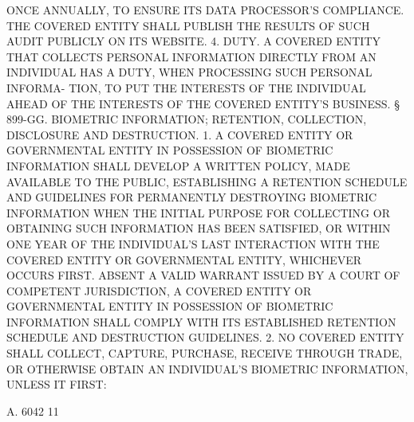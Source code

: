 ONCE  ANNUALLY,  TO ENSURE ITS DATA PROCESSOR'S COMPLIANCE.  THE COVERED
 ENTITY SHALL PUBLISH THE RESULTS OF SUCH AUDIT PUBLICLY ON ITS WEBSITE.
   4. DUTY. A COVERED ENTITY THAT COLLECTS PERSONAL INFORMATION  DIRECTLY
 FROM  AN  INDIVIDUAL  HAS A DUTY, WHEN PROCESSING SUCH PERSONAL INFORMA-
 TION, TO PUT THE INTERESTS OF THE INDIVIDUAL AHEAD OF THE  INTERESTS  OF
 THE COVERED ENTITY'S BUSINESS.
   § 899-GG. BIOMETRIC INFORMATION; RETENTION, COLLECTION, DISCLOSURE AND
 DESTRUCTION.  1.   A COVERED ENTITY OR GOVERNMENTAL ENTITY IN POSSESSION
 OF BIOMETRIC INFORMATION SHALL DEVELOP A WRITTEN POLICY, MADE  AVAILABLE
 TO  THE  PUBLIC,  ESTABLISHING  A  RETENTION SCHEDULE AND GUIDELINES FOR
 PERMANENTLY DESTROYING BIOMETRIC INFORMATION WHEN  THE  INITIAL  PURPOSE
 FOR  COLLECTING  OR  OBTAINING  SUCH  INFORMATION HAS BEEN SATISFIED, OR
 WITHIN ONE YEAR OF THE INDIVIDUAL'S LAST INTERACTION  WITH  THE  COVERED
 ENTITY  OR  GOVERNMENTAL  ENTITY, WHICHEVER OCCURS FIRST. ABSENT A VALID
 WARRANT ISSUED BY A COURT OF COMPETENT JURISDICTION, A COVERED ENTITY OR
 GOVERNMENTAL ENTITY IN POSSESSION OF BIOMETRIC INFORMATION SHALL  COMPLY
 WITH ITS ESTABLISHED RETENTION SCHEDULE AND DESTRUCTION GUIDELINES.
   2. NO COVERED ENTITY SHALL COLLECT, CAPTURE, PURCHASE, RECEIVE THROUGH
 TRADE, OR OTHERWISE OBTAIN AN INDIVIDUAL'S BIOMETRIC INFORMATION, UNLESS
 IT FIRST:

 A. 6042                            11
 
